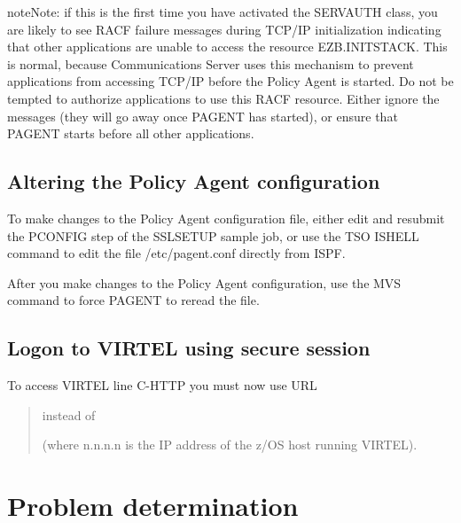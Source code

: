 \documentclass[letterpaper,10pt,english]{sphinxmanual}
\begin{document}
\begin{sphinxadmonition}{note}{Note:}
if this is the first time you have activated the SERVAUTH class, you are likely to see RACF failure messages during TCP/IP initialization indicating that other applications are unable to access the resource EZB.INITSTACK. This is normal, because Communications Server uses this mechanism to prevent applications from accessing TCP/IP before the Policy Agent is started. Do not be tempted to authorize applications to use this RACF resource. Either ignore the messages (they will go away once PAGENT has started), or
ensure that PAGENT starts before all other applications.
\end{sphinxadmonition}


\subsection{Altering the Policy Agent configuration}
\label{\detokenize{connectivity_guide:altering-the-policy-agent-configuration}}
To make changes to the Policy Agent configuration file, either edit and resubmit the PCONFIG step of the SSLSETUP sample job, or use the TSO ISHELL command to edit the file /etc/pagent.conf directly from ISPF.

After you make changes to the Policy Agent configuration, use the MVS command  to force PAGENT to reread the file.


\subsection{Logon to VIRTEL using secure session}
\label{\detokenize{connectivity_guide:logon-to-virtel-using-secure-session}}
To access VIRTEL line C-HTTP you must now use URL
\begin{quote}

 instead of 

(where n.n.n.n is the IP address of the z/OS host running VIRTEL).
\end{quote}

\newpage

\ignorespaces 

\section{Problem determination}
\label{\detokenize{connectivity_guide:problem-determination}}\label{\detokenize{connectivity_guide:index-159}}
\end{document}
